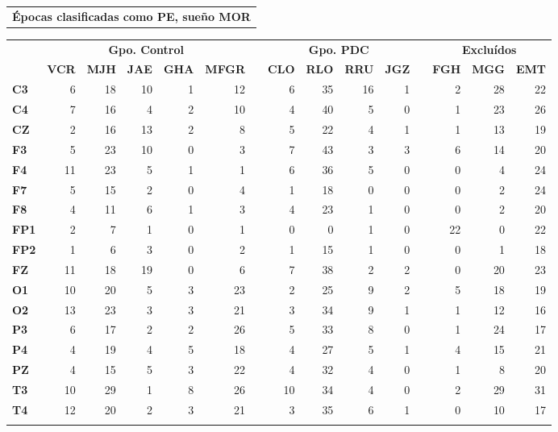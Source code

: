 \documentclass[12pt,a4paper]{mitthesis}
\begin{document}
\begin{SidewaysTable}
\centering
\begin{tabular}{c}
\textbf{\'Epocas clasificadas como PE, sue\~no MOR}
\vspace{1em}
\end{tabular}
\begin{tabular}{lrrrrrcrrrrcrrr}
\toprule
& \multicolumn{5}{c}{\textbf{Gpo. Control}} && 
  \multicolumn{4}{c}{\textbf{Gpo. PDC}} && 
  \multicolumn{3}{c}{\textbf{Exclu\'idos}}\\
\cmidrule{2-6} \cmidrule{8-11} \cmidrule{13-15}
& \textbf{VCR} & \textbf{MJH} & \textbf{JAE} & \textbf{GHA} & \textbf{MFGR} & \phantom{l}
& \textbf{CLO} & \textbf{RLO} & \textbf{RRU} & \textbf{JGZ} & \phantom{l}
& \textbf{FGH} & \textbf{MGG} & \textbf{EMT} \\
\midrule
\textbf{C3} &6 &18&10&1 &12&&6 &35&16&1 &&2 &28&22 \\
\textbf{C4} &7 &16&4 &2 &10&&4 &40&5 &0 &&1 &23&26 \\
\textbf{CZ} &2 &16&13&2 &8 &&5 &22&4 &1 &&1 &13&19 \\
\rowcolor{gris}
\textbf{F3} &5 &23&10&0 &3 &&7 &43&3 &3 &&6 &14&20 \\
\rowcolor{gris}
\textbf{F4} &11&23&5 &1 &1 &&6 &36&5 &0 &&0 &4 &24 \\
\rowcolor{gris}
\textbf{F7} &5 &15&2 &0 &4 &&1 &18&0 &0 &&0 &2 &24 \\
\rowcolor{gris}
\textbf{F8} &4 &11&6 &1 &3 &&4 &23&1 &0 &&0 &2 &20 \\
\textbf{FP1}&2 &7 &1 &0 &1 &&0 &0 &1 &0 &&22&0 &22 \\
\textbf{FP2}&1 &6 &3 &0 &2 &&1 &15&1 &0 &&0 &1 &18 \\
\textbf{FZ} &11&18&19&0 &6 &&7 &38&2 &2 &&0 &20&23 \\
\rowcolor{gris}
\textbf{O1} &10&20&5 &3 &23&&2 &25&9 &2 &&5 &18&19 \\
\rowcolor{gris}
\textbf{O2} &13&23&3 &3 &21&&3 &34&9 &1 &&1 &12&16 \\
\textbf{P3} &6 &17&2 &2 &26&&5 &33&8 &0 &&1 &24&17 \\
\textbf{P4} &4 &19&4 &5 &18&&4 &27&5 &1 &&4 &15&21 \\
\textbf{PZ} &4 &15&5 &3 &22&&4 &32&4 &0 &&1 &8 &20 \\
\rowcolor{gris}
\textbf{T3} &10&29&1 &8 &26&&10&34&4 &0 &&2 &29&31 \\
\rowcolor{gris}
\textbf{T4} &12&20&2 &3 &21&&3 &35&6 &1 &&0 &10&17 \\
\rowcolor{gris}

\end{tabular}
\end{SidewaysTable}
\end{document}
